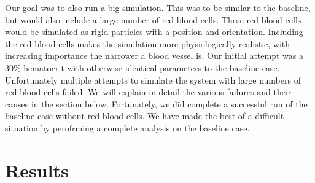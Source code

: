 \documentclass[11pt]{article} %
\begin{document}
Our goal was to also run a big simulation.  
This was to be similar to the baseline, but would also include a large number of red blood cells.
These red blood cells would be simulated as rigid particles with a position and orientation.
Including the red blood cells makes the simulation more physiologically realistic,
with increasing importance the narrower a blood vessel is.
Our initial attempt was a 30\% hematocrit with otherwise identical parameters to the baseline case.  
Unfortunately multiple attempts to simulate the system with large numbers of red blood cells failed.
We will explain in detail the various failures and their causes in the section below.
Fortunately, we did complete a successful run of the baseline case without red blood cells.
We have made the best of a difficult situation by perofrming a complete analysis on the baseline case.

\newpage
\section{Results}
\end{document}
